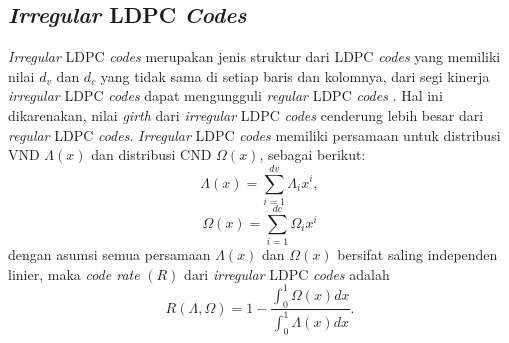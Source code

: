 \subsection{\textit{Irregular} LDPC \textit{Codes}}
\textit{Irregular} LDPC \textit{codes} merupakan jenis struktur dari LDPC \textit{codes} yang memiliki nilai $d_{v}$ dan $d_{c}$ yang tidak sama di setiap baris dan kolomnya, dari segi kinerja \textit{irregular} LDPC \textit{codes} dapat mengungguli \textit{regular} LDPC \textit{codes} \cite{ldpc7}. Hal ini dikarenakan, nilai \textit{girth} dari \textit{irregular} LDPC \textit{codes} cenderung lebih besar dari \textit{regular} LDPC \textit{codes}. \textit{Irregular} LDPC \textit{codes} memiliki persamaan untuk distribusi VND $\Lambda (x)$ dan distribusi CND $\Omega (x)$, sebagai berikut:
\begin{equation}
\Lambda (x)=\sum_{i= 1}^{dv}\Lambda_{i}x^{i},
\label{eq:Distribusi Kolom Irregular LDPC codes}
\end{equation}
\begin{equation}
\Omega (x)=\sum_{i= 1}^{dc}\Omega_{i}x^{i}
\label{eq:Distribusi Baris Irregular LDPC codes}
\end{equation}
dengan asumsi semua persamaan $\Lambda (x)$ dan $\Omega (x)$ bersifat saling independen linier, maka \textit{code rate} $(R)$ dari \textit{irregular} LDPC \textit{codes} adalah 
\begin{equation}
R(\Lambda,\Omega) = 1-\frac{\int_{0}^{1}\Omega (x)dx}{\int_{0}^{1}\Lambda (x)dx}.
\label{eq:Rate Irregular LDPC codes}
\end{equation}

